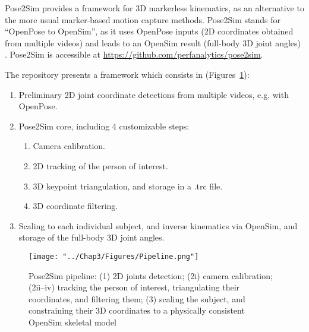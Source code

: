 

Pose2Sim \cite{Pagnon2022b} provides a framework for 3D markerless kinematics, as an alternative to the more usual marker-based motion capture methods. Pose2Sim stands for “OpenPose to OpenSim”,
as it uses OpenPose inputs (2D coordinates obtained from multiple videos) \cite{Cao2019} and leads to an
OpenSim result (full-body 3D joint angles) \cite{Delp2007,Seth2018}. Pose2Sim is accessible at \url{https://github.com/perfanalytics/pose2sim}.

The repository presents a framework which consists in (Figures~\ref{fig_pipeline}):
\begin{enumerate}[itemsep=-0.5em, topsep=0pt, leftmargin=*]
      \item Preliminary 2D joint coordinate detections from multiple videos, e.g. with OpenPose.
      \item Pose2Sim core, including 4 customizable steps:
      \begin{enumerate}[before=\vspace{-0.5\baselineskip}, nosep]
            \item Camera calibration.
            \item 2D tracking of the person of interest.
            \item 3D keypoint triangulation, and storage in a .trc file.
            \item 3D coordinate filtering.
      \end{enumerate}
      \item Scaling to each individual subject, and inverse kinematics via OpenSim, and storage of the full-body 3D joint angles.
\end{enumerate}

\begin{figure}[hbtp]
	\centering
	\def\svgwidth{1\columnwidth}
	\fontsize{10pt}{10pt}\selectfont
	\texttt{[image: "../Chap3/Figures/Pipeline.png"]}
	\caption{Pose2Sim pipeline: (1) 2D joints detection; (2i) camera calibration; (2ii–iv) tracking the person of interest, triangulating their coordinates, and filtering them; (3) scaling the subject, and constraining their 3D coordinates to a physically consistent OpenSim skeletal model}
	\label{fig_pipeline}
\end{figure}
\FloatBarrier

